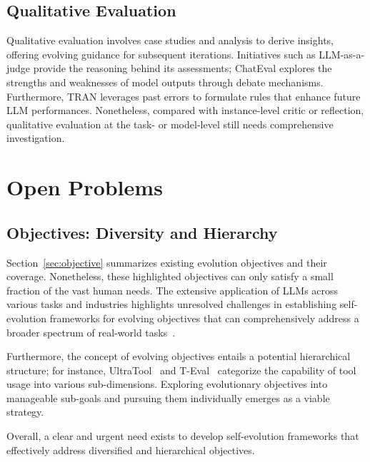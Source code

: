 \documentclass[sn-basic, Numbered]{sn-jnl}%
\theoremstyle{thmstyleone}%
\theoremstyle{thmstyletwo}%
\theoremstyle{thmstylethree}%
\begin{document}
\subsection{Qualitative Evaluation}
Qualitative evaluation involves case studies and analysis to derive insights, offering evolving guidance for subsequent iterations. Initiatives such as LLM-as-a-judge \cite{zheng2024judging} provide the reasoning behind its assessments; ChatEval \cite{chan2023chateval} explores the strengths and weaknesses of model outputs through debate mechanisms. Furthermore, TRAN \cite{yang2023failures} leverages past errors to formulate rules that enhance future LLM performances. Nonetheless, compared with instance-level critic or reflection, qualitative evaluation at the task- or model-level still needs comprehensive investigation.


% 
\section{Open Problems}
\label{sec:future}

\subsection{Objectives: Diversity and Hierarchy}
\label{sec:objective coverage}
Section~\ref{sec:objective} summarizes existing evolution objectives and their coverage. Nonetheless, these highlighted objectives can only satisfy a small fraction of the vast human needs. 
The extensive application of LLMs across various tasks and industries highlights unresolved challenges in establishing self-evolution frameworks for evolving objectives that can comprehensively address a broader spectrum of real-world tasks~\cite{eloundou2023gpts}. 

Furthermore, the concept of evolving objectives entails a potential hierarchical structure; for instance, UltraTool~\cite{huang2024planning} and T-Eval~\cite{chen2023t} categorize the capability of tool usage into various sub-dimensions. Exploring evolutionary objectives into manageable sub-goals and pursuing them individually emerges as a viable strategy. 

Overall, a clear and urgent need exists to develop self-evolution frameworks that effectively address diversified and hierarchical objectives.
\end{document}
